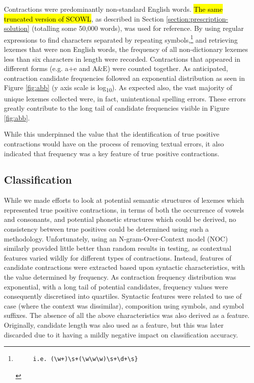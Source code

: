 Contractions were predominantly non-standard English words. \hl{ The same truncated version of SCOWL}, as described in Section \ref{section:prescription-solution} (totalling some 50,000 words), was used for reference. By using regular expressions to find characters  separated by repeating symbols,\footnote{\vspace{-24pt} \begin{verbatim}     i.e. (\w+)\s+(\w\w\w)\s+\d+\s}\end{verbatim}} and retrieving lexemes that were non English words, the frequency of all non-dictionary lexemes less than six characters in length were recorded. Contractions that appeared in different forms (e.g. a+e and A\&E) were counted together. As anticipated, contraction candidate frequencies followed an exponential distribution as seen in Figure \ref{fig:abb} (y axis scale is
log\textsubscript{10}). As expected also, the vast majority of unique lexemes collected were, in fact, unintentional spelling errors. These errors greatly contribute to the long tail of candidate frequencies visible in Figure \ref{fig:abb}.

While this underpinned the value that the identification of true positive contractions would have on the process of removing textual errors, it also indicated that frequency was a key feature of true positive contractions.


\subsection{Classification}

While we made efforts to look at potential semantic structures of lexemes which represented true positive contractions, in terms of both the occurrence of vowels and consonants, and potential phonetic structures which could be derived, no consistency between true positives could be determined using such a methodology. Unfortunately, using an N-gram-Over-Context model (NOC)\cite{kawamae2016n} similarly provided little better than random results in testing, as contextual features varied wildly for different types of contractions. Instead, features of candidate contractions were extracted based upon syntactic characteristics, with the value determined by frequency. As contraction frequency distribution was exponential, with a long tail of potential candidates, frequency values were consequently discretised into quartiles. Syntactic features were related to use of case (where the context was dissimilar), composition using symbols, and symbol suffixes. The absence of all the above characteristics was also derived as a feature. Originally, candidate length was also used as a feature, but this was later discarded due to it having a mildly negative impact on classification
accuracy.

